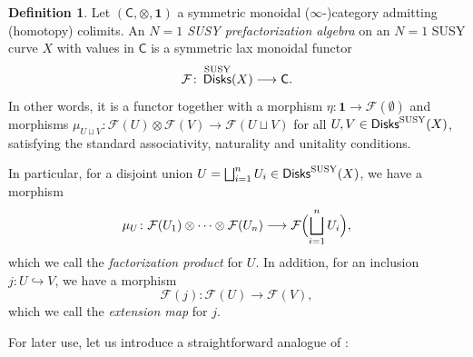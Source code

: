 \documentclass[final,reqno]{amsart}
\numberwithin{equation}{section}
\theoremstyle{definition}
\newtheorem{dfn}[thm]{Definition}
\newcommand{\inj}{\hookrightarrow}
\newcommand{\lto}{\longrightarrow}
\newcommand{\mto}{\mapsto}
\newcommand{\SUSY}{\textup{SUSY}}
\newcommand{\clF}{\mathcal{F}}
\newcommand{\sfC}{\mathsf{C}}
\DeclareMathOperator{\Disk}{\mathsf{Disks}}
\begin{document}
\begin{dfn}%
Let $(\sfC,\otimes,\bm{1})$ a symmetric monoidal ($\infty$-)category 
admitting (homotopy) colimits. 
An \emph{$N=1$ SUSY prefactorization algebra} on an $N=1$ SUSY curve $X$ 
with values in $\sfC$ is a symmetric lax monoidal functor
\[
 \clF\colon \Disk^{\SUSY}(X) \lto \sfC.
\]
In other words, it is a functor together with a morphism 
$\eta\colon \bm{1} \to \clF(\emptyset)$ and morphisms 
$\mu_{U \sqcup V}\colon \clF(U) \otimes \clF(V) \to \clF(U \sqcup V)$
for all $U,V \in \Disk^{\SUSY}(X)$,
satisfying the standard associativity, naturality and unitality conditions.
\end{dfn}

In particular, for a disjoint union 
$U=\bigsqcup_{i=1}^n U_i \in \Disk^{\SUSY}(X)$, we have a morphism
\begin{align}\label{eq:1:str}
 \mu_U\colon \clF(U_1) \otimes \dotsb \otimes \clF(U_n) \lto 
 \clF\Bigl(\bigsqcup_{i=1}^n U_i\Bigr), 
\end{align}
which we call the \emph{factorization product} for $U$.
In addition, for an inclusion $j\colon U \inj V$, we have a morphism
\[
 \clF(j)\colon \clF(U) \lto \clF(V),
\]
which we call the \emph{extension map} for $j$.

For later use, let us introduce 
a straightforward analogue of \cite[Definition 3.1.3]{CG1}: 


\end{document}
